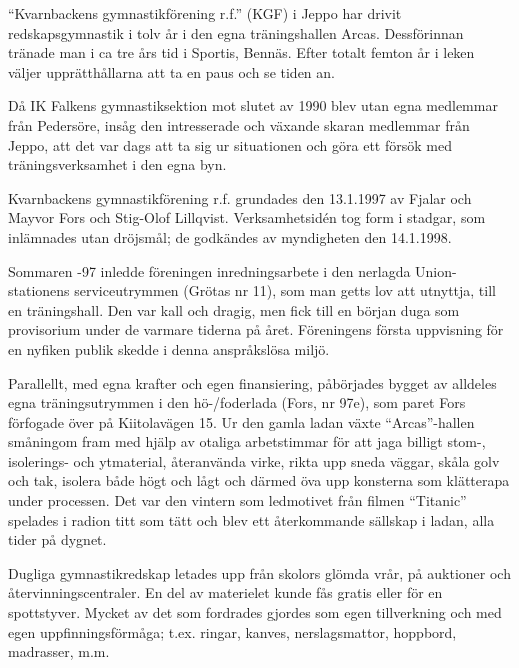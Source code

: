%


``Kvarnbackens gymnastikförening r.f.'' (KGF) i Jeppo har drivit redskapsgymnastik i tolv år i den egna träningshallen Arcas. Dessförinnan tränade man i ca tre års tid i Sportis, Bennäs. Efter totalt femton år i leken väljer upprätthållarna att ta en paus och se tiden an.

Då IK Falkens gymnastiksektion mot slutet av 1990 blev utan egna medlemmar från Pedersöre, insåg den intresserade och växande skaran medlemmar från Jeppo, att det var dags att ta sig ur situationen och göra ett försök med träningsverksamhet i den egna byn.

Kvarnbackens gymnastikförening r.f. grundades den 13.1.1997 av Fjalar och Mayvor Fors och Stig-Olof Lillqvist. Verksamhetsidén tog form i stadgar, som inlämnades utan dröjsmål; de godkändes av myndigheten den 14.1.1998.


Sommaren -97 inledde föreningen inredningsarbete i den nerlagda Union-stationens serviceutrymmen (Grötas nr 11), som man getts lov att utnyttja, till en träningshall. Den var kall och dragig, men fick till en början duga som provisorium under de varmare tiderna på året. Föreningens första uppvisning för en nyfiken publik skedde i denna anspråkslösa miljö.

Parallellt, med egna krafter och egen finansiering, påbörjades bygget av alldeles egna träningsutrymmen i den hö-/foderlada (Fors, nr 97e), som paret Fors förfogade över på Kiitolavägen 15. Ur den gamla ladan växte ``Arcas''-hallen småningom fram med hjälp av otaliga arbetstimmar för att jaga billigt stom-, isolerings- och ytmaterial, återanvända virke, rikta upp sneda väggar, skåla golv och tak, isolera både högt och lågt och därmed öva upp konsterna som klätterapa under processen. Det var den vintern som ledmotivet från filmen ``Titanic'' spelades i radion titt som tätt och blev ett återkommande sällskap i ladan, alla tider på dygnet.


Dugliga gymnastikredskap letades upp från skolors glömda vrår, på auktioner och återvinningscentraler. En del av materielet kunde fås gratis eller för en spottstyver. Mycket av det som fordrades gjordes som egen tillverkning och med egen uppfinningsförmåga; t.ex. ringar, kanves, nerslagsmattor, hoppbord, madrasser, m.m.

